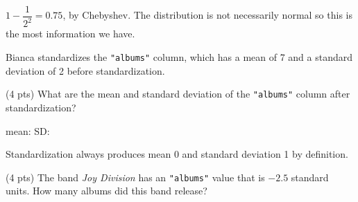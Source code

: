 \documentclass[twoside,12pt]{article}
\begin{document}
\begin{probset}
\begin{prob}[(8 pts)]
\begin{subprobset}
\begin{subprob}
\smallskip


\smallskip


\smallskip


\smallskip


\begin{soln}
$1 - \dfrac{1}{2^2} = 0.75$, by Chebyshev. The distribution is not necessarily normal so this is the most information we have.
\end{soln}

\end{subprob}

\end{subprobset}

\end{prob}

\newpage

\begin{prob}[(17 pts)]

Bianca standardizes the \texttt{"albums"} column, which has a mean of 7 and a standard deviation of 2 before standardization. 

\begin{subprobset}



\begin{subprob}(4 pts)
What are the mean and standard deviation of the \texttt{"albums"} column after standardization?

\smallskip
\begin{center}
    mean:  \qquad
    SD: 
\end{center}

\begin{soln}
Standardization always produces mean 0 and standard deviation 1 by definition.
\end{soln}

\end{subprob}

\bigskip

\begin{subprob}(4 pts)
The band \textit{Joy Division} has an \texttt{"albums"} value that is $-2.5$ standard units. How many albums did this band release?


\end{subprob}
\end{subprobset}
\end{prob}
\end{probset}
\end{document}

